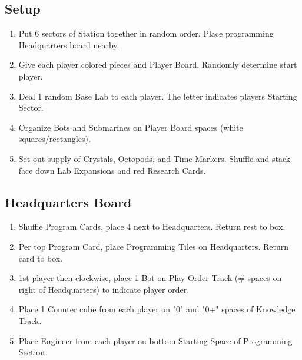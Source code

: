 \documentclass[12pt]{article}
\newenvironment{enumerateCustom}
{\begin{enumerate}
  \setlength{\itemsep}{1pt}
  \setlength{\parskip}{0pt}
  \setlength{\parsep}{0pt}}
{\end{enumerate}}
\begin{document}
\begin{multicols*}{2}

\section*{Setup}
\begin{enumerateCustom}
    \item Put 6 sectors of Station together in random order. Place programming Headquarters board nearby.
    \item Give each player colored pieces and Player Board. Randomly determine start player.
    \item Deal 1 random Base Lab to each player. The letter indicates players Starting Sector.
    \item Organize Bots and Submarines on Player Board spaces (white squares/rectangles).
    \item Set out supply of Crystals, Octopods, and Time Markers. Shuffle and stack face down Lab Expansions and red Research Cards.
\end{enumerateCustom}

\subsection*{Headquarters Board}
\begin{enumerateCustom}
    \item Shuffle Program Cards, place 4 next to Headquarters. Return rest to box.
    \item Per top Program Card, place Programming Tiles on Headquarters. Return card to box.
    \item 1st player then clockwise, place 1 Bot on Play Order Track (\# spaces on right of Headquarters) to indicate player order.
    \item Place 1 Counter cube from each player on "0" and "0+" spaces of Knowledge Track.
    \item Place Engineer from each player on bottom Starting Space of Programming Section.
\end{enumerateCustom}


\end{multicols*}
\end{document}
